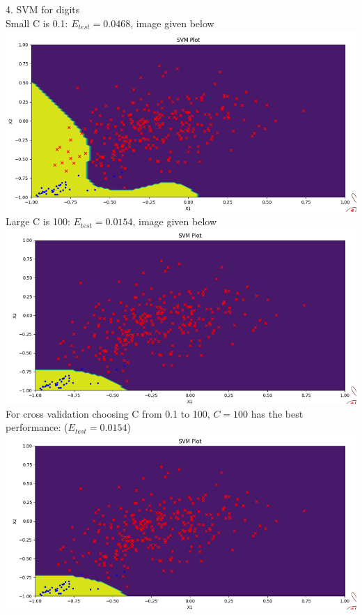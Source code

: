\documentclass[12pt]{article}
\begin{document}
4. SVM for digits\\
Small C is 0.1: $E_{test} = 0.0468$, image given below\\
\includegraphics[scale=0.6]{images/svm_c01}\\
Large C is 100: $E_{test} = 0.0154$, image given below\\
\includegraphics[scale=0.6]{images/svm_c100}\\
For cross validation choosing C from 0.1 to 100, $C=100$ has the best performance: ($E_{test}=0.0154$)\\
\includegraphics[scale=0.6]{images/svm_c100}\\
\end{document}
